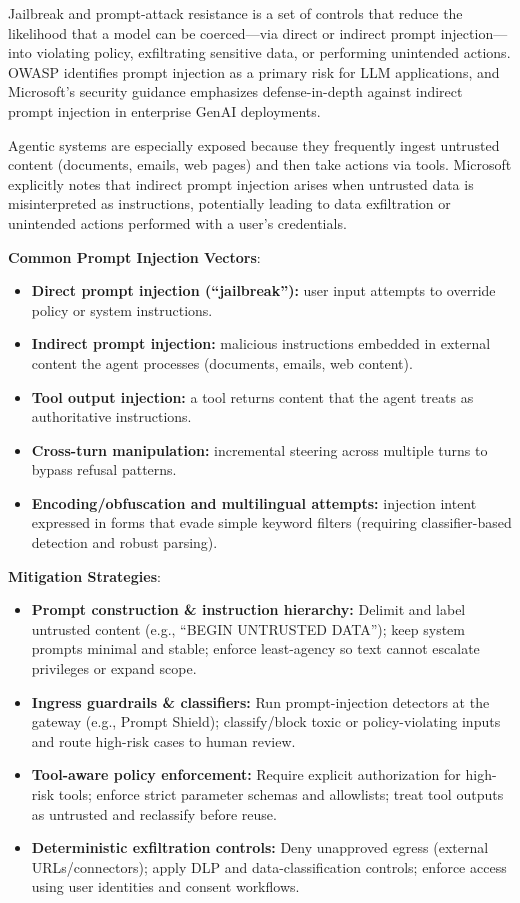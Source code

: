 \begin{TNtwocol}
    Jailbreak and prompt-attack resistance is a set of controls that reduce the likelihood that a model can be coerced—via direct or indirect prompt injection—into violating policy, exfiltrating sensitive data, or performing unintended actions. OWASP identifies prompt injection as a primary risk for LLM applications, and Microsoft’s security guidance emphasizes defense-in-depth against indirect prompt injection in enterprise GenAI deployments.

    Agentic systems are especially exposed because they frequently ingest untrusted content (documents, emails, web pages) and then take actions via tools. Microsoft explicitly notes that indirect prompt injection arises when untrusted data is misinterpreted as instructions, potentially leading to data exfiltration or unintended actions performed with a user’s credentials.

    \textbf{Common Prompt Injection Vectors}:
    \begin{itemize}
        \item \textbf{Direct prompt injection (“jailbreak”):} user input attempts to override policy or system instructions.
        \item \textbf{Indirect prompt injection:} malicious instructions embedded in external content the agent processes (documents, emails, web content).
        \item \textbf{Tool output injection:} a tool returns content that the agent treats as authoritative instructions.
        \item \textbf{Cross-turn manipulation:} incremental steering across multiple turns to bypass refusal patterns.
        \item \textbf{Encoding/obfuscation and multilingual attempts:} injection intent expressed in forms that evade simple keyword filters (requiring classifier-based detection and robust parsing).
    \end{itemize}

    \textbf{Mitigation Strategies}:
    \begin{itemize}
        \item \textbf{Prompt construction \& instruction hierarchy:} Delimit and label untrusted content (e.g., ``BEGIN UNTRUSTED DATA''); keep system prompts minimal and stable; enforce least-agency so text cannot escalate privileges or expand scope.
        \item \textbf{Ingress guardrails \& classifiers:} Run prompt-injection detectors at the gateway (e.g., Prompt Shield); classify/block toxic or policy-violating inputs and route high-risk cases to human review.
        \item \textbf{Tool-aware policy enforcement:} Require explicit authorization for high-risk tools; enforce strict parameter schemas and allowlists; treat tool outputs as untrusted and reclassify before reuse.
        \item \textbf{Deterministic exfiltration controls:} Deny unapproved egress (external URLs/connectors); apply DLP and data-classification controls; enforce access using user identities and consent workflows.
    \end{itemize}


\end{TNtwocol}
